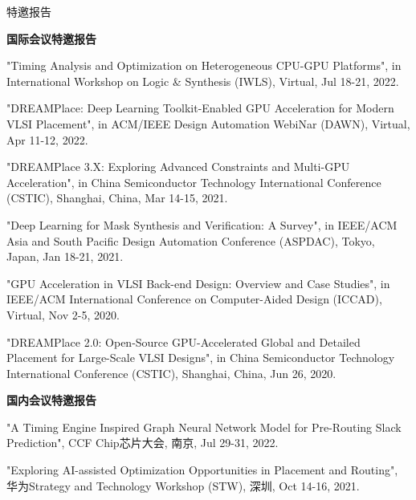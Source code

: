 \begin{rSection}{特邀报告}


\textbf{国际会议特邀报告}
        
\begin{description}[font=\normalfont]

\item[{[T6]}]{
"Timing Analysis and Optimization on Heterogeneous CPU-GPU Platforms", in International Workshop on Logic \& Synthesis (IWLS), Virtual, Jul 18-21, 2022. 
}

\item[{[T5]}]{
"DREAMPlace: Deep Learning Toolkit-Enabled GPU Acceleration for Modern VLSI Placement", in ACM/IEEE Design Automation WebiNar (DAWN), Virtual, Apr 11-12, 2022. 
}

\item[{[T4]}]{
"DREAMPlace 3.X: Exploring Advanced Constraints and Multi-GPU Acceleration", in China Semiconductor Technology International Conference (CSTIC), Shanghai, China, Mar 14-15, 2021. 
}

\item[{[T3]}]{
"Deep Learning for Mask Synthesis and Verification: A Survey", in IEEE/ACM Asia and South Pacific Design Automation Conference (ASPDAC), Tokyo, Japan, Jan 18-21, 2021.
}

\item[{[T2]}]{
"GPU Acceleration in VLSI Back-end Design: Overview and Case Studies", in IEEE/ACM International Conference on Computer-Aided Design (ICCAD), Virtual, Nov 2-5, 2020. 
}

\item[{[T1]}]{
"DREAMPlace 2.0: Open-Source GPU-Accelerated Global and Detailed Placement for Large-Scale VLSI Designs", in China Semiconductor Technology International Conference (CSTIC), Shanghai, China, Jun 26, 2020. 
}

\end{description}


\textbf{国内会议特邀报告}
        
\begin{description}[font=\normalfont]

\item[{[T7]}]{
"A Timing Engine Inspired Graph Neural Network Model for Pre-Routing Slack Prediction", CCF Chip芯片大会, 南京, Jul 29-31, 2022. 
}

\item[{[T6]}]{
"Exploring AI-assisted Optimization Opportunities in Placement and Routing", 华为Strategy and Technology Workshop (STW), 深圳, Oct 14-16, 2021. 
}


\end{description}
\end{rSection}
